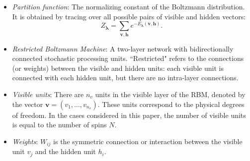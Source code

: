 \documentclass[submission, Phys, hidelnks]{SciPost}
\begin{document}
\begin{itemize}
\item {\it Partition function}: The normalizing constant of the Boltzmann distribution. It is obtained by tracing over all possible pairs of visible and hidden vectors:
\begin{equation}
   Z_{\bm{\lambda}} = \sum\limits_{\bm{v},\bm{h}}e^{-E_{\bm{\lambda}}(\bm{v},\bm{h})}.
\end{equation}

\item {\it Restricted Boltzmann Machine}: A two-layer network with bidirectionally connected stochastic processing units. ``Restricted" refers to the connections (or weights) between the visible and hidden units: each visible unit is connected with each hidden unit, but there are no intra-layer connections.

\item {\it Visible units}: There are $n_v$ units in the visible layer of the RBM, denoted by the vector $\bm{v}=(v_1,\dots,v_{n_v})$. These units correspond to the physical degrees of freedom. In the cases considered in this paper, the number of visible units is equal to the number of spins $N$.

\item {\it Weights}: $W_{ij}$ is the symmetric connection or interaction between the visible unit $v_j$ and the hidden unit $h_i$.

\end{itemize}


\nolinenumbers
\end{document}
